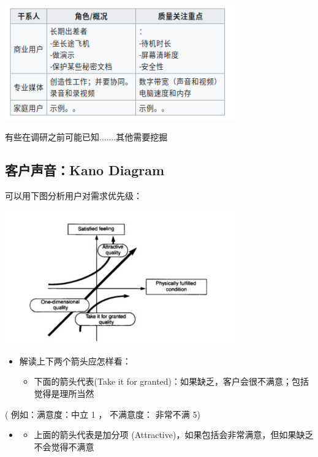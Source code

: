 \includegraphics[width=10cm]{Screenshotfrom2022-12-2807-16-55.png}

有些在调研之前可能已知.......其他需要挖掘

\hypertarget{ux5ba2ux6237ux58f0ux97f3kano-diagram}{%
\subsection{客户声音：Kano
Diagram}\label{ux5ba2ux6237ux58f0ux97f3kano-diagram}}

可以用下图分析用户对需求优先级：


\includegraphics[width=10cm]{IcKanoDiagramScreenshot_2022-12-17_120845.jpg}

\begin{itemize}
\tightlist
\item
  解读上下两个箭头应怎样看：

  \begin{itemize}
  \tightlist
  \item
    下面的箭头代表(Take it for
    granted)：如果缺乏，客户会很不满意；包括觉得是理所当然\\
  \end{itemize}
\end{itemize}

( 例如：满意度：中立 1 ， 不满意度： 非常不满 5)

\begin{itemize}
\item
  \begin{itemize}
  \tightlist
  \item
    上面的箭头代表是加分项
    (Attractive)，如果包括会非常满意，但如果缺乏不会觉得不满意\\
  \end{itemize}
\end{itemize}

